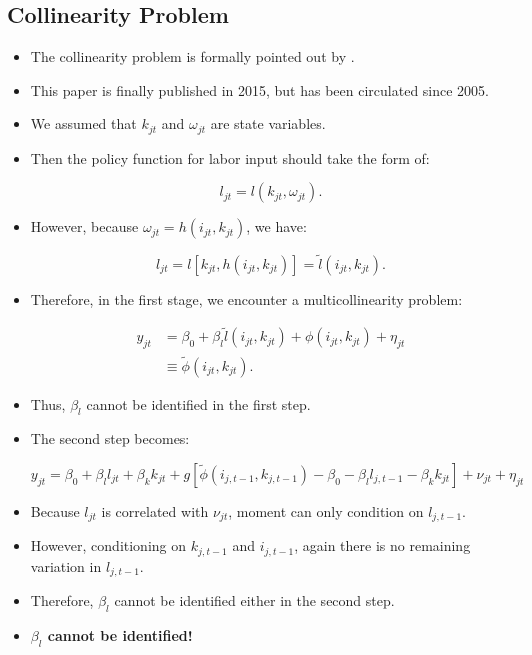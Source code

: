 \documentclass[]{book}
\providecommand{\tightlist}{%
  \setlength{\itemsep}{0pt}\setlength{\parskip}{0pt}}
\theoremstyle{definition}
\theoremstyle{definition}
\theoremstyle{definition}
\theoremstyle{remark}
\begin{document}
\subsection{Collinearity Problem}\label{collinearity-problem}

\begin{itemize}
\tightlist
\item
  The collinearity problem is formally pointed out by
  \citet{Ackerberg2015}.
\item
  This paper is finally published in 2015, but has been circulated since
  2005.
\item
  We assumed that \(k_{jt}\) and \(\omega_{jt}\) are state variables.
\item
  Then the policy function for labor input should take the form of:

  \begin{equation}
  l_{jt} = l(k_{jt}, \omega_{jt}).
  \end{equation}
\item
  However, because \(\omega_{jt} = h(i_{jt}, k_{jt})\), we have:

  \begin{equation}
  l_{jt} = l[k_{jt}, h(i_{jt}, k_{jt})] = \tilde{l}(i_{jt}, k_{jt}).
  \end{equation}
\item
  Therefore, in the first stage, we encounter a multicollinearity
  problem:

  \begin{equation}
  \begin{split}
  y_{jt} &= \beta_0 + \beta_l \tilde{l}(i_{jt}, k_{jt}) + \phi(i_{jt}, k_{jt}) + \eta_{jt}\\
  &\equiv \tilde{\phi}(i_{jt}, k_{jt}).
  \end{split}
  \end{equation}
\item
  Thus, \(\beta_l\) cannot be identified in the first step.
\item
  The second step becomes:

  \begin{equation}
  y_{jt} = \beta_0 + \beta_l l_{jt} + \beta_k k_{jt} + g[\tilde{\phi}(i_{j, t - 1}, k_{j, t - 1}) - \beta_0 - \beta_l l_{j, t - 1} - \beta_k k_{jt}] + \nu_{jt} + \eta_{jt}
  \end{equation}
\item
  Because \(l_{jt}\) is correlated with \(\nu_{jt}\), moment can only
  condition on \(l_{j, t - 1}\).
\item
  However, conditioning on \(k_{j, t - 1}\) and \(i_{j, t - 1}\), again
  there is no remaining variation in \(l_{j, t - 1}\).
\item
  Therefore, \(\beta_l\) cannot be identified either in the second step.
\item
  \textbf{\(\beta_l\) cannot be identified!}
\end{itemize}
\end{document}
